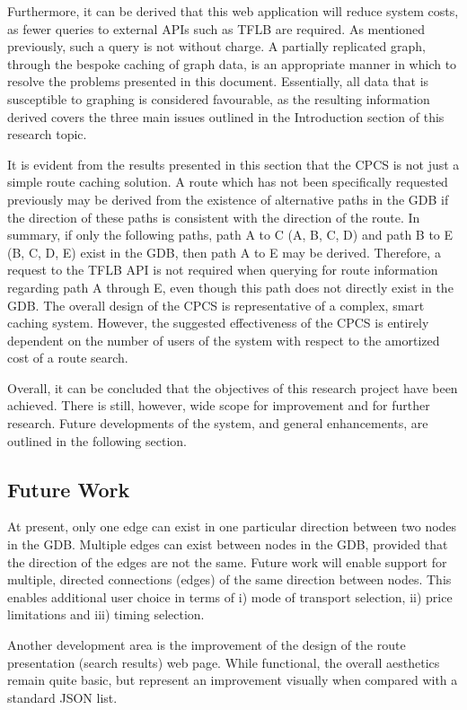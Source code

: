 \documentclass[12pt]{article}   	%
\begin{document}
Furthermore, it can be derived that this web application will reduce system costs, as fewer queries to external APIs such as TFLB are required. As mentioned previously, such a query is not without charge. A partially replicated graph, through the bespoke caching of graph data, is an appropriate manner in which to resolve the problems presented in this document. Essentially, all data that is susceptible to graphing is considered favourable, as the resulting information derived covers the three main issues outlined in the Introduction section of this research topic.

It is evident from the results presented in this section that the CPCS is not just a simple route caching solution. A route which has not been specifically requested previously may be derived from the existence of alternative paths in the GDB if the direction of these paths is consistent with the direction of the route. In summary, if only the following paths, path A to C (A, B, C, D) and path B to E (B, C, D, E) exist in the GDB, then path A to E may be derived. Therefore, a request to the TFLB API is not required when querying for route information regarding path A through E, even though this path does not directly exist in the GDB. The overall design of the CPCS is representative of a complex, smart caching system. However, the suggested effectiveness of the CPCS is entirely dependent on the number of users of the system with respect to the amortized cost of a route search.

Overall, it can be concluded that the objectives of this research project have been achieved. There is still, however, wide scope for improvement and for further research. Future developments of the system, and general enhancements, are outlined in the following section.

\newpage

\subsection{Future Work}
At present, only one edge can exist in one particular direction between two nodes in the GDB. Multiple edges can exist between nodes in the GDB, provided that the direction of the edges are not the same. Future work will enable support for multiple, directed connections (edges) of the same direction between nodes. This enables additional user choice in terms of i) mode of transport selection, ii) price limitations and iii) timing selection.

Another development area is the improvement of the design of the route presentation (search results) web page. While functional, the overall aesthetics remain quite basic, but represent an improvement visually when compared with a standard JSON list.
\end{document}
